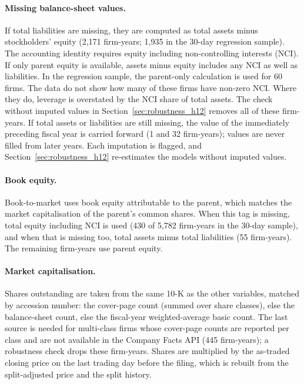 \paragraph{Missing balance-sheet values.} If total liabilities are missing,
they are computed as total assets minus stockholders' equity (2{,}171
firm-years; 1{,}935 in the 30-day regression sample). The accounting identity requires equity including non-controlling interests (NCI). If only parent equity is available, assets minus equity includes any NCI as well as liabilities. In the regression sample, the parent-only calculation is used for 60 firms. The data do not show how many of these firms have non-zero NCI.
Where they do, leverage is overstated by the NCI share of total assets. The
check without imputed values in Section~\ref{sec:robustness_h12} removes all
of these firm-years. If total assets or liabilities are still missing, the
value of the immediately preceding fiscal year is carried forward (1 and 32
firm-years); values are never filled from later years. Each imputation is
flagged, and Section~\ref{sec:robustness_h12} re-estimates the models without
imputed values.

\paragraph{Book equity.} Book-to-market uses book equity attributable to the
parent, which matches the market
capitalisation of the parent's common shares. When this tag is missing, total
equity including NCI is used (430 of 5{,}782 firm-years in the 30-day
sample), and when that is missing too, total assets minus total liabilities
(55 firm-years). The remaining firm-years use parent equity.

\paragraph{Market capitalisation.} Shares outstanding are taken from the same
10-K as the other variables, matched by accession number: the cover-page
count (summed over share classes), else the balance-sheet count, else the fiscal-year weighted-average
basic count. The last source is needed for multi-class firms whose
cover-page counts are reported per class and are not available in the
Company Facts API (445 firm-years); a robustness check drops these
firm-years. Shares are multiplied by the as-traded closing price on the last
trading day before the filing, which is rebuilt from the split-adjusted
price and the split history.


